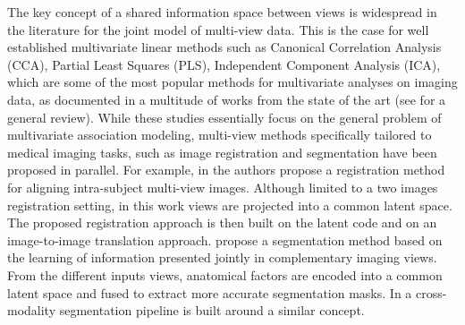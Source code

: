 The key concept of a shared information space between views is widespread in the literature for the joint model of multi-view data.
%
This is the case for well established multivariate linear methods such as
Canonical Correlation Analysis (CCA),
Partial Least Squares (PLS),
Independent Component Analysis (ICA),
which are some of the most popular methods for multivariate analyses on imaging data, as documented in a multitude of works from the state of the art (see \cite{Liu2014} for a general review).
%
While these studies essentially focus on the general problem of multivariate association modeling, multi-view methods specifically tailored to medical imaging tasks, such as image registration and segmentation have been proposed in parallel.
For example, in \cite{Qin2019} the authors propose
a registration method for aligning intra-subject multi-view images.
Although limited to a two images registration setting,
in this work views are projected into a common latent space.
The proposed registration approach is then built on the latent code and on an image-to-image translation approach.
%
%
\cite{Chartsias2021} propose a segmentation method based on the learning of information presented jointly in complementary imaging views.
From the different inputs views, anatomical factors are encoded into a common latent space and fused to extract more accurate segmentation masks.
%
%
In \cite{Yang2020} a cross-modality segmentation pipeline is built around a similar concept.
% 

